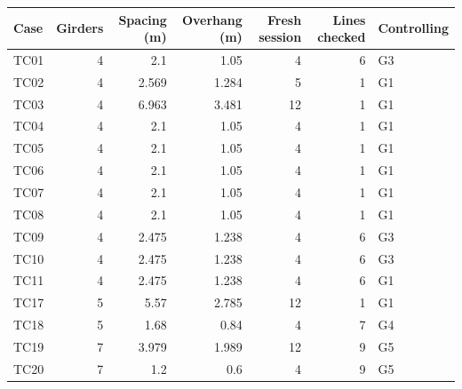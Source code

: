 \begin{tabular}{@{}lrrrrrl@{}}
\toprule
\textbf{Case} & \textbf{Girders} & \textbf{Spacing (m)} & \textbf{Overhang (m)} & \textbf{Fresh session} & \textbf{Lines checked} & \textbf{Controlling} \\
\midrule
TC01 & 4 & 2.1 & 1.05 & 4 & 6 & G3 \\
TC02 & 4 & 2.569 & 1.284 & 5 & 1 & G1 \\
TC03 & 4 & 6.963 & 3.481 & 12 & 1 & G1 \\
TC04 & 4 & 2.1 & 1.05 & 4 & 1 & G1 \\
TC05 & 4 & 2.1 & 1.05 & 4 & 1 & G1 \\
TC06 & 4 & 2.1 & 1.05 & 4 & 1 & G1 \\
TC07 & 4 & 2.1 & 1.05 & 4 & 1 & G1 \\
TC08 & 4 & 2.1 & 1.05 & 4 & 1 & G1 \\
TC09 & 4 & 2.475 & 1.238 & 4 & 6 & G3 \\
TC10 & 4 & 2.475 & 1.238 & 4 & 6 & G3 \\
TC11 & 4 & 2.475 & 1.238 & 4 & 6 & G1 \\
TC17 & 5 & 5.57 & 2.785 & 12 & 1 & G1 \\
TC18 & 5 & 1.68 & 0.84 & 4 & 7 & G4 \\
TC19 & 7 & 3.979 & 1.989 & 12 & 9 & G5 \\
TC20 & 7 & 1.2 & 0.6 & 4 & 9 & G5 \\
\bottomrule
\end{tabular}
